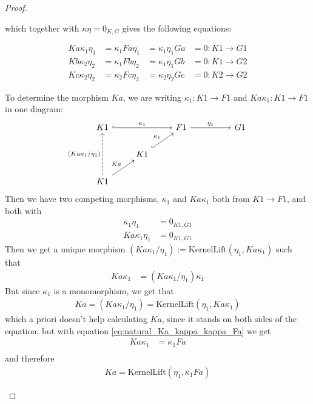 \begin{proof}
\begin{enumerate}
\begin{subproof}
which together with $\kappa \eta = 0_{K,G}$ gives the following equations:

\begin{subequations}
\begin{alignat}{4}
Ka\kappa_{1}\eta_{1} &= \kappa_{1}Fa\eta_{1} &= \kappa_{1}\eta_{1}Ga &= 0 : K1 \rightarrow G1 \\
Kb\kappa_{2}\eta_{2} &= \kappa_{1}Fb\eta_{2} &= \kappa_{1}\eta_{1}Gb &= 0 : K1 \rightarrow G2 \\
Kc\kappa_{2}\eta_{2} &= \kappa_{2}Fc\eta_{2} &= \kappa_{2}\eta_{2}Gc &= 0 : K2 \rightarrow G2
\end{alignat}
\end{subequations}

To determine the morphism $Ka$, we are writing $\kappa_{1} : K1 \rightarrow F1$ and $Ka \kappa_{1} : K1 \rightarrow F1$ in one diagram:
\[
\begin{tikzcd}
K1 \arrow[rr, "\kappa_{1}", hook]                                 &                                   & F1 \arrow[rr, "\eta_{1}"] &  & G1 \\
                                                                  & K1 \arrow[ru, "\kappa_{1}", hook] &                           &  &    \\
K1 \arrow[ru, "Ka"] \arrow[uu, "(Ka\kappa_{1}/\eta_{1})", dashed] &                                   &                           &  &   
\end{tikzcd}
\]
Then we have two competing morphisms, $\kappa_{1}$ and $Ka \kappa_{1}$ both from $K1 \rightarrow F1$, and both with
\begin{align*}
\kappa_{1}\eta_{1} &= 0_{K1,G1} \\
Ka \kappa_{1}\eta_{1} &= 0_{K1,G1}
\end{align*}
Then we get a unique morphism $(Ka\kappa_{1}/\eta_{1}) := \mathrm{KernelLift}(\eta_{1},Ka\kappa_{1})$ such that
\begin{align*}
Ka\kappa_{1} &= (Ka\kappa_{1}/\eta_{1})\kappa_{1}
\end{align*}
But since $\kappa_{1}$ is a monomorphism, we get that
\begin{align*}
Ka = (Ka\kappa_{1}/\eta_{1}) = \mathrm{KernelLift}(\eta_{1},Ka\kappa_{1})
\end{align*}
which a priori doesn't help calculating $Ka$, since it stands on both sides of the equation, but with equation
\eqref{eq:natural_Ka_kappa_kappa_Fa} we get
\begin{align*}
Ka\kappa_{1} &= \kappa_{1} Fa \\
\end{align*}
and therefore
\begin{align*}
Ka = \mathrm{KernelLift}(\eta_{1},\kappa_{1} Fa)
\end{align*}


\end{subproof}
\end{enumerate}
\end{proof}
